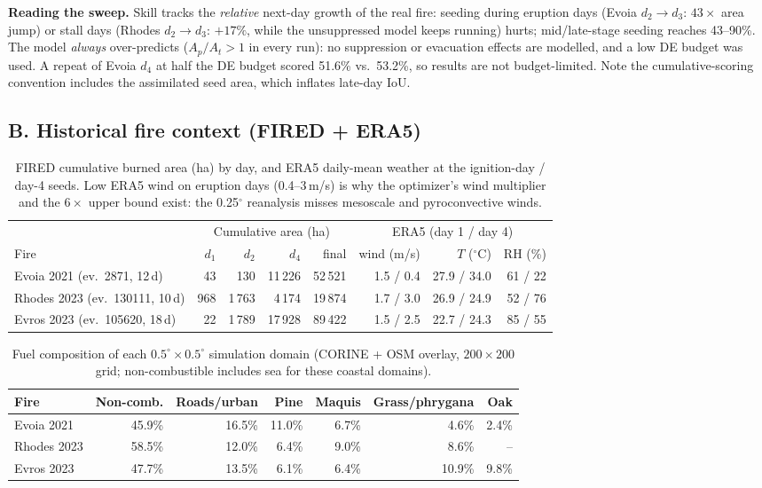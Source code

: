 \documentclass[11pt]{article}
\begin{document}
\noindent\textbf{Reading the sweep.} Skill tracks the \emph{relative}
next-day growth of the real fire: seeding during eruption days
(Evoia $d_2{\to}d_3$: $43\times$ area jump) or stall days (Rhodes
$d_2{\to}d_3$: $+17\%$, while the unsuppressed model keeps running) hurts;
mid/late-stage seeding reaches 43--90\%. The model \emph{always}
over-predicts ($A_p/A_t>1$ in every run): no suppression or evacuation
effects are modelled, and a low DE budget was used. A repeat of Evoia
$d_4$ at half the DE budget scored 51.6\% vs.\ 53.2\%, so results are not
budget-limited. Note the cumulative-scoring convention includes the
assimilated seed area, which inflates late-day IoU.

\subsection*{B. Historical fire context (FIRED + ERA5)}

\begin{table}[htbp]
\centering
\caption{FIRED cumulative burned area (ha) by day, and ERA5 daily-mean
weather at the ignition-day / day-4 seeds. Low ERA5 wind on eruption days
(0.4--3\,m/s) is why the optimizer's wind multiplier and the $6{\times}$
upper bound exist: the 0.25$^\circ$ reanalysis misses mesoscale and
pyroconvective winds.}
\begin{tabular}{lrrrrrrr}
\toprule
 & \multicolumn{4}{c}{Cumulative area (ha)} & \multicolumn{3}{c}{ERA5 (day 1 / day 4)} \\
\cmidrule(lr){2-5}\cmidrule(lr){6-8}
Fire & $d_1$ & $d_2$ & $d_4$ & final & wind (m/s) & $T$ ($^\circ$C) & RH (\%) \\
\midrule
Evoia 2021 (ev.\ 2871, 12\,d)  & 43   & 130   & 11\,226 & 52\,521 & 1.5 / 0.4 & 27.9 / 34.0 & 61 / 22 \\
Rhodes 2023 (ev.\ 130111, 10\,d) & 968 & 1\,763 & 4\,174 & 19\,874 & 1.7 / 3.0 & 26.9 / 24.9 & 52 / 76 \\
Evros 2023 (ev.\ 105620, 18\,d) & 22   & 1\,789 & 17\,928 & 89\,422 & 1.5 / 2.5 & 22.7 / 24.3 & 85 / 55 \\
\bottomrule
\end{tabular}
\end{table}

\begin{table}[htbp]
\centering
\caption{Fuel composition of each $0.5^\circ{\times}0.5^\circ$ simulation
domain (CORINE + OSM overlay, $200{\times}200$ grid; non-combustible
includes sea for these coastal domains).}
\begin{tabular}{lrrrrrr}
\toprule
Fire & Non-comb. & Roads/urban & Pine & Maquis & Grass/phrygana & Oak \\
\midrule
Evoia 2021  & 45.9\% & 16.5\% & 11.0\% & 6.7\% & 4.6\% & 2.4\% \\
Rhodes 2023 & 58.5\% & 12.0\% &  6.4\% & 9.0\% & 8.6\% & --   \\
Evros 2023  & 47.7\% & 13.5\% &  6.1\% & 6.4\% & 10.9\% & 9.8\% \\
\bottomrule
\end{tabular}
\end{table}
\end{document}
